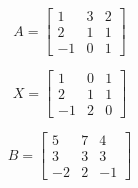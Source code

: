 \begin{equation}
    A =
    \left[
        \begin{array}{c|cc}
            1 & 3 & 2 \\
            2 & 1 & 1 \\
            \hline
            -1 & 0 & 1
        \end{array}
        \right]
    \label{eq:equation}
\end{equation}

\begin{equation}
    X =
    \left[
        \begin{array}{c|cc}
            1 & 0 & 1 \\
            \hline
            2 & 1 & 1 \\
            -1 & 2 & 0
        \end{array}
        \right]
    \label{eq:equation2}
\end{equation}

\begin{equation}
    B =
    \left[
        \begin{array}{c|cc}
            5 & 7 & 4 \\
            3 & 3 & 3 \\
            \hline
            -2 & 2 & -1
        \end{array}
        \right]
    \label{eq:equation3}
\end{equation}